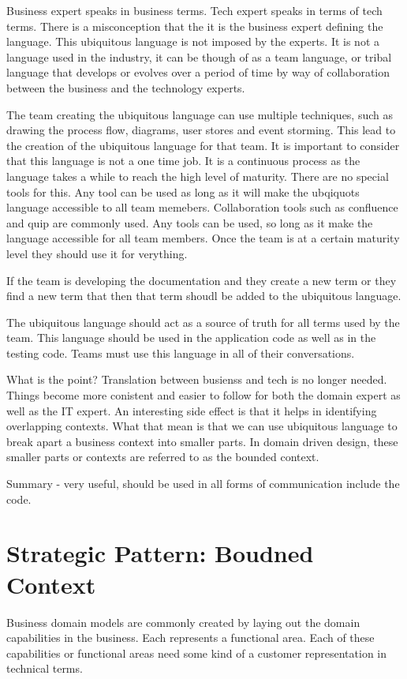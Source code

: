 Business expert speaks in business terms.
Tech expert speaks in terms of tech terms.
There is a misconception that the it is the business expert defining the language.
This ubiquitous language is not imposed by the experts.
It is not a language used in the industry, it can be though of as a team language, or tribal language that develops or evolves over a period of time by way of collaboration between the business and the technology experts.

The team creating the ubiquitous language can use multiple techniques, such as drawing the process flow, diagrams, user stores and event storming.
This lead to the creation of the ubiquitous language for that team.
It is important to consider that this language is not a one time job.
It is a continuous process as the language takes a while to reach the high level of maturity.
There are no special tools for this.
Any tool can be used as long as it will make the ubqiquots language accessible to all team memebers.
Collaboration tools such as confluence and quip are commonly used.
Any tools can be used, so long as it make the language accessible for all team members. Once the team is at a certain maturity level they should use it for verything.

If the team is developing the documentation and they create a new term or they find a new term that then that term shoudl be added to the ubiquitous language.

The ubiquitous language should act as a source of truth for all terms used by the team.
This language should be used in the application code as well as in the testing code.
Teams must use this language in all of their conversations.

What is the point?
Translation between busienss and tech is no longer needed.
Things become more conistent and easier to follow for both the domain expert as well as the IT expert.
An interesting side effect is that it helps in identifying overlapping contexts.
What that mean is that we can use ubiquitous language to break apart a business context into smaller parts.
In domain driven design, these smaller parts or contexts are referred to as the bounded context.

Summary - very useful, should be used in all forms of communication include the code.

\section{Strategic Pattern: Boudned Context}
Business domain models are commonly created by laying out the domain capabilities in the business.
Each represents a functional area.
Each of these capabilities or functional areas need some kind of a customer representation in technical terms.

